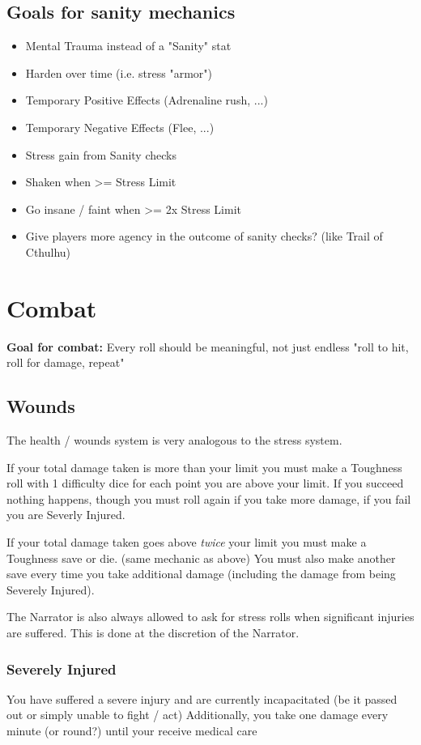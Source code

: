 \section*{Goals for sanity mechanics}
\begin{itemize}
    \item Mental Trauma instead of a "Sanity" stat
    \item Harden over time (i.e. stress "armor")
    \item Temporary Positive Effects (Adrenaline rush, ...)
    \item Temporary Negative Effects (Flee, ...)
    \item Stress gain from Sanity checks
    \item Shaken when >= Stress Limit
    \item Go insane / faint when >= 2x Stress Limit
    \item Give players more agency in the outcome of sanity checks? (like Trail of Cthulhu)
\end{itemize}


\chapter{Combat}

\textbf{Goal for combat:} Every roll should be meaningful, not just endless "roll to hit, roll for damage, repeat" 

\section{Wounds}
The health / wounds system is very analogous to the stress system.

If your total damage taken is more than your limit you must make a Toughness roll with 1 difficulty dice for each point you are above your limit.  
If you succeed nothing happens, though you must roll again if you take more damage, if you fail you are Severly Injured.

If your total damage taken goes above \textit{twice} your limit you must make a Toughness save or die. (same mechanic as above)  
You must also make another save every time you take additional damage (including the damage from being Severely Injured).

The Narrator is also always allowed to ask for stress rolls when significant injuries are suffered. 
This is done at the discretion of the Narrator.


\subsection{Severely Injured}
You have suffered a severe injury and are currently incapacitated (be it passed out or simply unable to fight / act)
Additionally, you take one damage every minute (or round?) until your receive medical care


